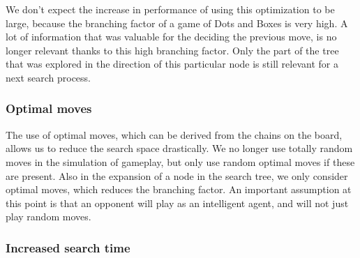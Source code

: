 	We don't expect the increase in performance of using this optimization to be large, because the branching factor of a game of Dots and Boxes is very high. A lot of information that was valuable for the deciding the previous move, is no longer relevant thanks to this high branching factor. Only the part of the tree that was explored in the direction of this particular node is still relevant for a next search process.
	
	\subsubsection{Optimal moves\label{s:optimalMoves}}
	
	The use of optimal moves, which can be derived from the chains on the board, allows us to reduce the search space drastically. We no longer use totally random moves in the simulation of gameplay, but only use random optimal moves if these are present. Also in the expansion of a node in the search tree, we only consider optimal moves, which reduces the branching factor.
	An important assumption at this point is that an opponent will play as an intelligent agent, and will not just play random moves. 
	
	\subsubsection{Increased search time}